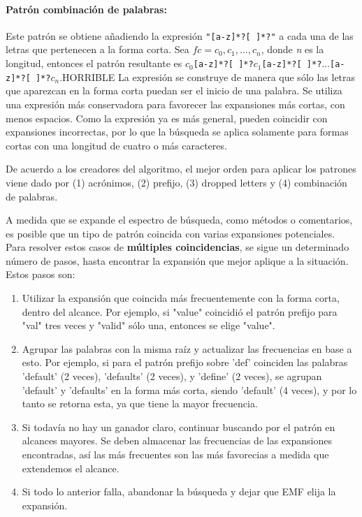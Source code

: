 {\paragraph{Patrón combinación de palabras:}
Este patrón se obtiene añadiendo la expresión \verb;"[a-z]*?[ ]*?"; a cada una de las letras que pertenecen a la forma corta.
Sea $fc = c_0, c_1, \dots, c_n$, donde \textit{n} es la longitud, entonces el patrón resultante es $c_0$\verb;[a-z]*?[ ]*?;$c_1$\verb;[a-z]*?[ ]*?;$\dots$\verb;[a-z]*?[ ]*?;$c_n$.HORRIBLE
La expresión se construye de manera que sólo las letras que aparezcan en la forma corta puedan ser el inicio de una palabra.
Se utiliza una expresión más conservadora para favorecer las expansiones más cortas, con menos espacios.
Como la expresión ya es más general, pueden coincidir con expansiones incorrectas, por lo que la búsqueda se aplica solamente para formas cortas con una longitud de cuatro o más caracteres.

De acuerdo a los creadores del algoritmo, el mejor orden para aplicar los patrones viene dado por (1) acrónimos, (2) prefijo, (3) dropped letters y (4) combinación de palabras.

A medida que se expande el espectro de búsqueda, como métodos o comentarios, es posible que un tipo de patrón coincida con varias expansiones potenciales.
Para resolver estos casos de \textbf{múltiples coincidencias}, se sigue un determinado número de pasos, hasta encontrar la expansión que mejor aplique a la situación.
Estos pasos son:
\begin{enumerate}
  \item Utilizar la expansión que coincida más frecuentemente con la forma corta, dentro del alcance.
  Por ejemplo, si "value" coincidió el patrón prefijo para "val" tres veces y "valid" sólo una, entonces se elige "value".
  \item Agrupar las palabras con la misma raíz y actualizar las frecuencias en base a esto.
  Por ejemplo, si para el patrón prefijo sobre 'def' coinciden las palabras 'default' (2 veces), 'defaults' (2 veces), y 'define' (2 veces), se agrupan 'default' y 'defaults' en la forma más corta, siendo 'default' (4 veces), y por lo tanto se retorna esta, ya que tiene la mayor frecuencia.
  \item Si todavía no hay un ganador claro, continuar buscando por el patrón en alcances mayores.
  Se deben almacenar las frecuencias de las expansiones encontradas, así las más frecuentes son las más favorecias a medida que extendemos el alcance.
  \item Si todo lo anterior falla, abandonar la búsqueda y dejar que EMF elija la expansión.
\end{enumerate}

}
